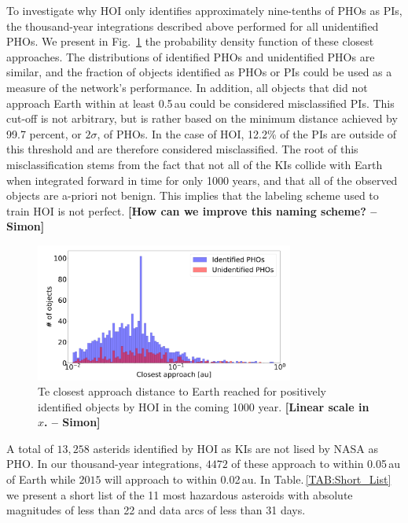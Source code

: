 \documentclass{aa}
\def\simon#1{{\bf {\color{green}[#1 -- Simon]}}}
\begin{document}
To investigate why HOI only identifies approximately nine-tenths of
PHOs as PIs, the thousand-year integrations described above performed
for all unidentified PHOs. We present in Fig.\,
\ref{FIG:Closeness_PHOs} the probability density function of these
closest approaches.  The distributions of identified PHOs and
unidentified PHOs are similar, and the fraction of objects identified
as PHOs or PIs could be used as a measure of the network's
performance.  In addition, all objects that did not approach Earth
within at least 0.5\,au could be considered misclassified PIs. This
cut-off is not arbitrary, but is rather based on the minimum distance
achieved by 99.7 percent, or $2\sigma$, of PHOs. In the case of HOI,
12.2\% of the PIs are outside of this threshold and are therefore
considered misclassified. The root of this misclassification stems
from the fact that not all of the KIs collide with Earth when
integrated forward in time for only 1000 years, and that all of the
observed objects are a-priori not benign. This implies that the
labeling scheme used to train HOI is not perfect.  \simon{How can we
  improve this naming scheme?}

\begin{figure}[h]
    \hspace*{-0.44cm}
	\includegraphics[width=85mm]{images/4_Closeness_Plots_PHOsLog.pdf}
	\centering
	\caption{\label{FIG:Closeness_PHOs} Te closest approach
          distance to Earth reached for positively identified objects
          by HOI in the coming 1000 year.
          \simon{Linear scale in
            $x$.}}
\end{figure}

A total of $13,258$ asterids identified by HOI as KIs are not lised by
NASA as PHO.  In our thousand-year integrations, $4472$ of these
approach to within 0.05\,au of Earth while $2015$ will approach to
within 0.02\,au.  In Table.\,\ref{TAB:Short_List} we present a short
list of the 11 most hazardous asteroids with absolute magnitudes of
less than 22 and data arcs of less than 31 days.
\end{document}
